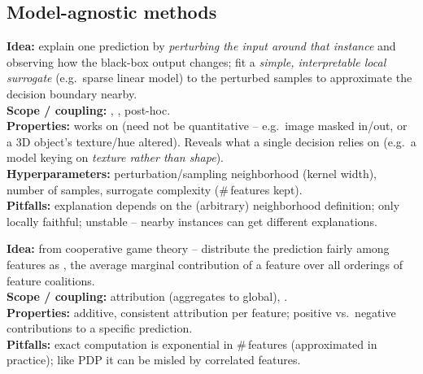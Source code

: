 \subsection{Model-agnostic methods}

\begin{algobox}
\textbf{Idea:} explain one prediction by \emph{perturbing the input around that
instance} and observing how the black-box output changes; fit a \emph{simple,
interpretable local surrogate} (e.g.\ sparse linear model) to the
perturbed samples to approximate the decision boundary nearby.\\
\textbf{Scope / coupling:} , , post-hoc.\\
\textbf{Properties:} works on  (need not be
quantitative -- e.g.\ image  masked in/out, or a 3D object's
texture/hue altered). Reveals what a single decision relies on (e.g.\ a model
keying on \emph{texture rather than shape}).\\
\textbf{Hyperparameters:} perturbation/sampling neighborhood (kernel width),
number of samples, surrogate complexity (\#\,features kept).\\
\textbf{Pitfalls:} explanation depends on the (arbitrary) neighborhood
definition; only locally faithful; unstable -- nearby instances can get
different explanations.
\end{algobox}

\begin{algobox}
\textbf{Idea:} from cooperative game theory -- distribute the prediction fairly
among features as , the average marginal contribution of a
feature over all orderings of feature coalitions.\\
\textbf{Scope / coupling:}  attribution (aggregates to global),
.\\
\textbf{Properties:} additive, consistent attribution per feature; positive vs.\
negative contributions to a specific prediction.\\
\textbf{Pitfalls:} exact computation is exponential in \#\,features (approximated
in practice); like PDP it can be misled by correlated features.
\end{algobox}

